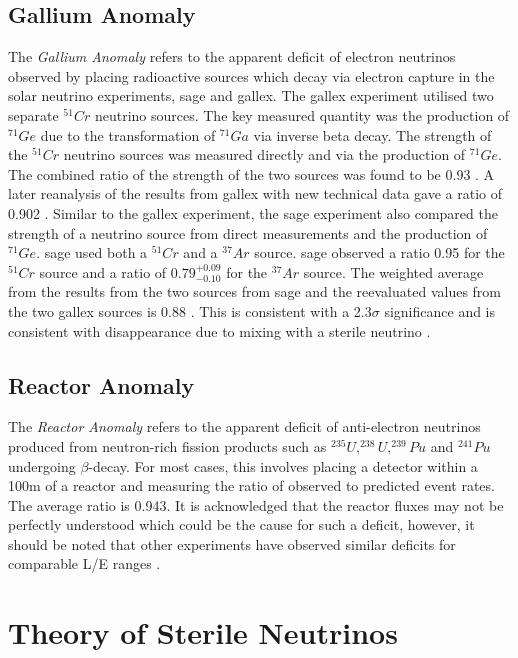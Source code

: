 \subsection{Gallium Anomaly}
The \textit{Gallium Anomaly} refers to the apparent deficit of electron neutrinos observed by placing radioactive sources which decay via electron capture in the solar neutrino experiments, \gls{sage} and \gls{gallex}. The \gls{gallex} experiment utilised two separate $^{51}Cr$ neutrino sources. The key measured quantity was the production of $^{71}Ge$ due to the transformation of $^{71}Ga$ via inverse beta decay. The strength of the $^{51}Cr$ neutrino sources was measured directly and via the production of $^{71}Ge$. The combined ratio of the strength of the two sources was found to be 0.93 \cite{GALLEX}. A later reanalysis of the results from \gls{gallex} with new technical data gave a ratio of 0.902 \cite{Gallex_reanalysis}. Similar to the \gls{gallex} experiment, the \gls{sage} experiment also compared the strength of a neutrino source from direct measurements and the production of $^{71}Ge$. \gls{sage} used both a $^{51}Cr$ and a $^{37}Ar$ source.  \gls{sage} observed a ratio 0.95 for the $^{51}Cr$ source and a ratio of $0.79^{+0.09}_{-0.10}$ for the $^{37}Ar$ source. The weighted average from the results from the two sources from \gls{sage} and the reevaluated values from the two \gls{gallex} sources is 0.88 \cite{SAGE}. This is consistent with a 2.3$\sigma$ significance and is consistent with \nuebar disappearance due to mixing with a sterile neutrino \cite{gallium_anomaly}.

\subsection{Reactor Anomaly}
The \textit{Reactor Anomaly} refers to the apparent deficit of anti-electron neutrinos produced from neutron-rich fission products such as $^{235}U, ^{238}U, ^{239}Pu$ and $^{241}Pu$ undergoing  $\beta$-decay. For most cases, this involves placing a detector within a 100m of a reactor and measuring the ratio of observed to predicted event rates. The average ratio is 0.943. It is acknowledged that the reactor fluxes may not be perfectly understood which could be the cause for such a deficit, however, it should be noted that other experiments have observed similar deficits for comparable L/E ranges \cite{Reactor_anomaly}. 

\section{Theory of Sterile Neutrinos}\label{subchap:Theory of Sterile Neutrinos}

